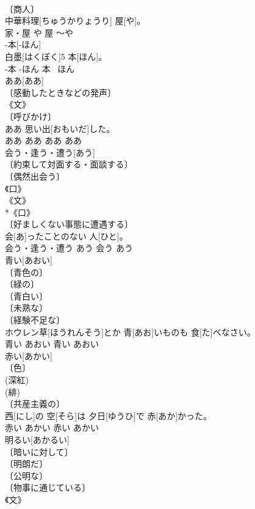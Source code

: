 \documentclass[8pt]{extreport}
\begin{document}
\begin{CJK}{UTF8}{min}
\\	〔商人〕 
\\	中華料理[ちゅうかりょうり] 屋[や]。	
\\	家・屋	や	屋	〜や	
\\	-本[-ほん]	
\\	白墨[はくぼく]5 本[ほん]。	
\\	-本	-ほん	本	~ほん	
\\	ああ[ああ]	
\\	〔感動したときなどの発声〕 
\\	《文》 
\\	〔呼びかけ〕 
\\	ああ 思い出[おもいだ]した。	
\\	ああ	ああ	ああ	ああ	
\\	会う・逢う・遭う[あう]	
\\	〔約束して対面する・面談する〕 
\\	〔偶然出会う〕 
\\	《口》 
\\	《文》 
\\	*《口》 
\\	〔好ましくない事態に遭遇する〕 
\\	会[あ]ったことのない 人[ひと]。	
\\	会う・逢う・遭う	あう	会う	あう	
\\	青い[あおい]	
\\	〔青色の〕 
\\	〔緑の〕 
\\	〔青白い〕 
\\	〔未熟な〕 
\\	〔経験不足な〕 
\\	[⇒あおにさい]	ホウレン草[ほうれんそう]とか 青[あお]いものも 食[た]べなさい。	
\\	青い	あおい	青い	あおい	
\\	赤い[あかい]	
\\	〔色〕 
\\	(深紅) 
\\	(緋) 
\\	〔共産主義の〕 
\\	西[にし]の 空[そら]は 夕日[ゆうひ]で 赤[あか]かった。	
\\	赤い	あかい	赤い	あかい	
\\	明るい[あかるい]	
\\	〔暗いに対して〕 
\\	〔明朗だ〕 
\\	〔公明な〕 
\\	〔物事に通じている〕 
\\	《文》 

\end{CJK}
\end{document}
